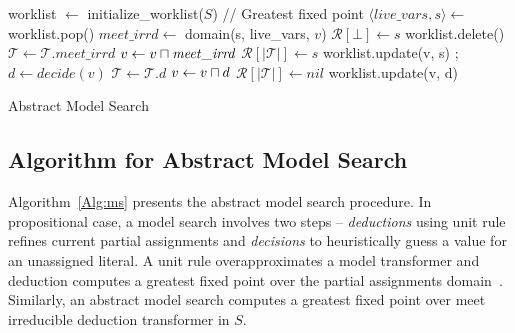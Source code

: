 \begin{algorithm2e}[htbp]
\DontPrintSemicolon
{}
\begin{small}
worklist $\leftarrow$ initialize\_worklist($S$) \;
\Loop{}
{
// Greatest fixed point \;
{
  $\langle live\_vars, s \rangle \leftarrow$ worklist.pop() \;
  $\mathit{meet\_irrd} \leftarrow$ domain(s, live\_vars, $v$)\;
   {
    $\mathcal{R}[\bot] \leftarrow s$ \;
    worklist.delete() \;
    \return \sat \;
  }
  \uElse
  {
    $\mathcal{T} \leftarrow \mathcal{T} . \mathit{meet\_irrd}$ \; 
    $v \leftarrow v \sqcap \mathit{meet\_irrd}$ \; 
    $\mathcal{R}[|\mathcal{T}|] \leftarrow s$ \;
    worklist.update(v, s) \; 
  }
}
 {
  \return \unsat;
}
$d \leftarrow decide(v)$ \;
 {
\return \unknown \;
}
$\mathcal{T} \leftarrow \mathcal{T} . d$ \; 
$v \leftarrow v \sqcap d$ \; 
$\mathcal{R}[|\mathcal{T}|] \leftarrow nil$ \;
worklist.update(v, d) \; 
}
\end{small}
\caption{Abstract Model Search\label{Alg:ms}}
\end{algorithm2e}
%
\subsection{Algorithm for Abstract Model Search}
Algorithm~\ref{Alg:ms} presents the abstract model search procedure. 
In propositional case, a model search involves two steps -- 
{\em deductions} using unit rule refines current partial assignments 
and {\em decisions} to heuristically guess a value for an unassigned 
literal.  A unit rule overapproximates a model transformer and deduction 
computes a greatest fixed point over the partial assignments
domain~\cite{dhk2013-popl}.  Similarly, an abstract model search computes
a greatest fixed point over meet irreducible deduction transformer in $S$.  


